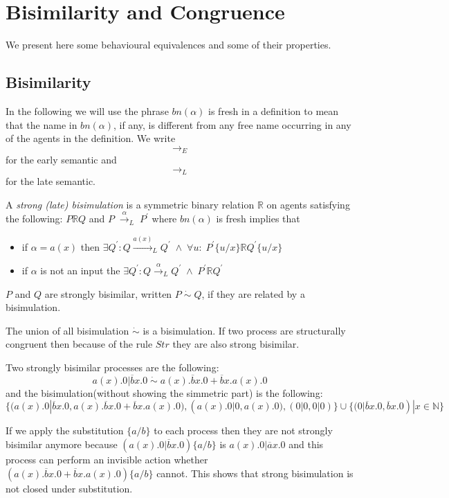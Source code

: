 \section{Bisimilarity and Congruence}

We present here some behavioural equivalences and some of their properties. 

\subsection{Bisimilarity}
In the following we will use the phrase $bn(\alpha)$ is fresh in a definition to mean that the name in $bn(\alpha)$, if any, is different from any free name occurring in any of the agents in the definition. We write 
\[
  \rightarrow_{E}
\]
for the early semantic and 
\[
  \rightarrow_{L}
\]
for the late semantic.

\begin{definition}
  A \emph{strong (late) bisimulation} is a symmetric binary relation $\mathbb{R}$ on agents satisfying the following: $P\mathbb{R} Q$ and $P\; \xrightarrow{\alpha}_{L}\; P^{'}$ where $bn(\alpha)$ is fresh implies that
  \begin{itemize}
    \item
      if $\alpha=a(x)$ then $\exists Q^{'}: Q\xrightarrow{a(x)}_{L}Q^{'}\; \wedge\; \forall u:\; P^{'}\{u/x\}\mathbb{R}Q^{'}\{u/x\}$
    \item
      if $\alpha$ is not an input the $\exists Q^{'}: Q\xrightarrow{\alpha}_{L}Q^{'}\; \wedge\; P^{'}\mathbb{R}Q^{'}$
  \end{itemize}
  $P$ and $Q$ are strongly bisimilar, written $P\; \dot{\sim}\; Q$, if they are related by a bisimulation. 
\end{definition}

The union of all bisimulation $\dot{\sim}$ is a bisimulation. If two process are structurally congruent then because of the rule $Str$ they are also strong bisimilar.

\begin{example}
  Two strongly bisimilar processes are the following:
  \[
    a(x).0|\overline{b}x.0\; \dot{\sim}\; a(x).\overline{b}x.0 + \overline{b}x.a(x).0
  \]
  and the bisimulation(without showing the simmetric part) is  the following:
  \[
    \{(a(x).0|\overline{b}x.0, a(x).\overline{b}x.0 + \overline{b}x.a(x).0),(a(x).0|0,a(x).0), (0|0,0|0)\} \cup \{(0|\overline{b}x.0,\overline{b}x.0)|x\in \mathbb{N}\} 
  \]

  If we apply the substitution $\{a/b\}$ to each process then they are not strongly bisimilar anymore because $(a(x).0|\overline{b}x.0)\{a/b\}$ is $a(x).0|\overline{a}x.0$ and this process can perform an invisible action whether $(a(x).\overline{b}x.0 + \overline{b}x.a(x).0)\{a/b\}$ cannot. This shows that strong bisimulation is not closed under substitution.
\end{example}

